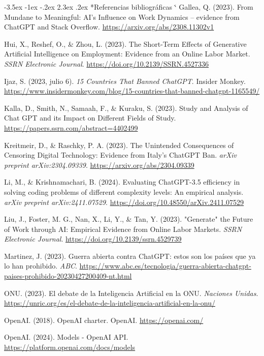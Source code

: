 \documentclass[12pt,a4paper]{article}
\makeatletter
\renewcommand{\refname}{\centering\normalfont Referencias bibliográficas}%
\renewcommand\section{\@startsection{section}{1}{\z@}%
  {-3.5ex \@plus -1ex \@minus -.2ex}%
  {2.3ex \@plus.2ex}%
  {\normalfont\normalsize}}
\renewenvironment{thebibliography}[1]{%
  \section*{\refname}%
  \list{}{%
    \usecounter{enumiv}%
    \setlength{\labelwidth}{0pt}%
    \setlength{\labelsep}{0pt}%
    \setlength{\leftmargin}{1.27cm}%
    \setlength{\itemindent}{-1.27cm}%
    \setlength{\itemsep}{\baselineskip}%
    \setlength{\parsep}{0pt}%
  }%
  \sloppy
  \clubpenalty4000\widowpenalty4000%
  \sfcode`\.\@m}%
  {\def\@noitemerr{\@latex@warning{Empty `thebibliography' environment}}%
   \endlist}
\makeatother
\begin{document}
\begin{singlespacing}
\begin{thebibliography}{}
Gallea, Q. (2023). From Mundane to Meaningful: AI's Influence on Work Dynamics -- evidence from ChatGPT and Stack Overflow. \url{https://arxiv.org/abs/2308.11302v1}

Hui, X., Reshef, O., \& Zhou, L. (2023). The Short-Term Effects of Generative Artificial Intelligence on Employment: Evidence from an Online Labor Market. \textit{SSRN Electronic Journal}. \url{https://doi.org/10.2139/SSRN.4527336}

Ijaz, S. (2023, julio 6). \textit{15 Countries That Banned ChatGPT}. Insider Monkey. \url{https://www.insidermonkey.com/blog/15-countries-that-banned-chatgpt-1165549/}

Kalla, D., Smith, N., Samaah, F., \& Kuraku, S. (2023). Study and Analysis of Chat GPT and its Impact on Different Fields of Study. \url{https://papers.ssrn.com/abstract=4402499}

Kreitmeir, D., \& Raschky, P. A. (2023). The Unintended Consequences of Censoring Digital Technology: Evidence from Italy's ChatGPT Ban. \textit{arXiv preprint arXiv:2304.09339}. \url{https://arxiv.org/abs/2304.09339}

Li, M., \& Krishnamachari, B. (2024). Evaluating ChatGPT-3.5 efficiency in solving coding problems of different complexity levels: An empirical analysis. \textit{arXiv preprint arXiv:2411.07529}. \url{https://doi.org/10.48550/arXiv.2411.07529}

Liu, J., Foster, M. G., Nan, X., Li, Y., \& Tan, Y. (2023). "Generate" the Future of Work through AI: Empirical Evidence from Online Labor Markets. \textit{SSRN Electronic Journal}. \url{https://doi.org/10.2139/ssrn.4529739}

Martinez, J. (2023). Guerra abierta contra ChatGPT: estos son los países que ya lo han prohibido. \textit{ABC}. \url{https://www.abc.es/tecnologia/guerra-abierta-chatgpt-paises-prohibido-20230427200409-nt.html}

ONU. (2023). El debate de la Inteligencia Artificial en la ONU. \textit{Naciones Unidas}. \url{https://unric.org/es/el-debate-de-la-inteligencia-artificial-en-la-onu/}

OpenAI. (2018). OpenAI charter. OpenAI. \url{https://openai.com/}

OpenAI. (2024). Models - OpenAI API. \url{https://platform.openai.com/docs/models}


\end{thebibliography}
\end{singlespacing}
\end{document}
